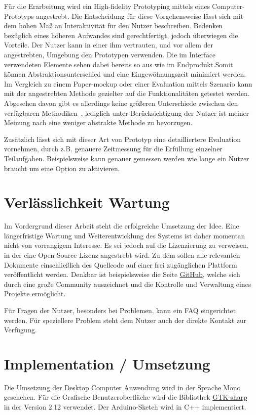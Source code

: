 Für die Erarbeitung wird ein High-fidelity Prototyping mittels eines Computer-Prototyps angestrebt. Die Entscheidung für diese Vorgehensweise lässt sich mit dem hohen Maß an Interaktivität für den Nutzer beschreiben. Bedenken bezüglich eines höheren Aufwandes sind gerechtfertigt, jedoch überwiegen die Vorteile. Der Nutzer kann in einer ihm vertrauten, und vor allem der angestrebten, Umgebung den Prototypen verwenden. Die im Interface verwendeten Elemente sehen dabei bereits so aus wie im Endprodukt.Somit können Abstraktionsunterschied und eine Eingewöhnungszeit minimiert werden. Im Vergleich zu einem Paper-mockup oder einer Evaluation mittels Szenario kann mit der angestrebten Methode gezielter auf die Funktionalitäten getestet werden. Abgesehen davon gibt es allerdings keine größeren Unterschiede zwischen den verfügbaren Methodiken~\cite{johansson_case_2007}, lediglich unter Berücksichtigung der Nutzer ist meiner Meinung nach eine weniger abstrakte Methode zu bevorzugen.

Zusätzlich lässt sich mit dieser Art von Prototyp eine detailliertere Evaluation vornehmen, durch z.B. genauere Zeitmessung für die Erfüllung einzelner Teilaufgaben. Beispielsweise kann genauer gemessen werden wie lange ein Nutzer braucht um eine Option zu aktivieren.
\section{Verlässlichkeit Wartung}
Im Vordergrund dieser Arbeit steht die erfolgreiche Umsetzung der Idee. Eine längerfristige Wartung und Weiterentwicklung des Systems ist daher momentan nicht von vorrangigem Interesse. Es sei jedoch auf die Lizenzierung zu verweisen, in der eine Open-Source Lizenz angestrebt wird. Zu dem sollen alle relevanten Dokumente einschließlich des Quellcode auf einer frei zugänglichen Plattform veröffentlicht werden.
Denkbar ist beispielsweise die Seite \href{https://github.com/}{GitHub}, welche sich durch eine große Community auszeichnet und die Kontrolle und Verwaltung eines Projekte ermöglicht.

Für Fragen der Nutzer, besonders bei Problemen, kann ein \acrshort{FAQ} eingerichtet werden. Für speziellere Problem steht dem Nutzer auch der direkte Kontakt zur Verfügung.
\section{Implementation / Umsetzung}
Die Umsetzung der Desktop Computer Anwendung wird in der Sprache \href{http://www.mono-project.com/}{Mono} geschehen. Für die Grafische Benutzeroberfläche wird die Bibliothek \href{http://www.gtk.org/}{GTK-sharp} in der Version 2.12 verwendet. Der Arduino-Sketch wird in C++ implementiert.

